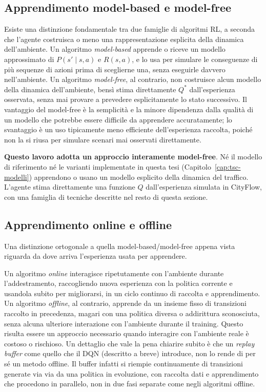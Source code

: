 \subsection{Apprendimento model-based e model-free}
\label{subsec:model-free}

Esiste una distinzione fondamentale tra due famiglie di algoritmi RL, a
seconda che l'agente costruisca o meno una rappresentazione esplicita
della dinamica dell'ambiente. Un algoritmo \emph{model-based} apprende
o riceve un modello approssimato di $P(s'\mid s,a)$ e $R(s,a)$, e lo usa
per simulare le conseguenze di più
sequenze di azioni prima di sceglierne una, senza eseguirle davvero nell'ambiente.
Un algoritmo \emph{model-free}, al contrario, non costruisce alcun modello della dinamica dell'ambiente, bensì stima
direttamente $Q^*$ dall'esperienza osservata, senza mai
provare a prevedere esplicitamente lo stato successivo. Il vantaggio del
model-free è la semplicità e la minore dipendenza dalla qualità di un
modello che potrebbe essere difficile da apprendere accuratamente; lo
svantaggio è un uso tipicamente meno efficiente dell'esperienza raccolta,
poiché non la si riusa per simulare scenari mai osservati direttamente.

\textbf{Questo lavoro adotta un approccio interamente model-free}. Né il
modello di riferimento \citep{wang2022metastgat} né le varianti
implementate in questa tesi (Capitolo~\ref{cap:tsc-modelli}) apprendono o
usano un modello esplicito della dinamica del traffico. L'agente stima
direttamente una funzione $Q$ dall'esperienza simulata in CityFlow, con una
famiglia di tecniche descritte nel resto di questa sezione.

\subsection{Apprendimento online e offline}
\label{subsec:online-offline}

Una distinzione ortogonale a quella model-based/model-free appena vista
riguarda da dove arriva l'esperienza usata per apprendere.

Un algoritmo \emph{online} interagisce ripetutamente con l'ambiente
durante l'addestramento, raccogliendo nuova esperienza con la politica
corrente e usandola subito per migliorarsi, in un ciclo continuo di raccolta e apprendimento.
Un algoritmo \emph{offline}, al contrario, apprende da un
insieme fisso di transizioni raccolto in precedenza, magari con una
politica diversa o addirittura sconosciuta, senza alcuna ulteriore
interazione con l'ambiente durante il training. Questo risulta essere un approccio necessario
quando interagire con l'ambiente reale è costoso o rischioso.
Un dettaglio che vale la pena chiarire subito è che un
\emph{replay buffer} come quello che il DQN (descritto a breve) introduce,
non lo rende di per sé un metodo offline. Il buffer infatti si riempie
continuamente di transizioni generate via via da una politica in
evoluzione, con raccolta dati e apprendimento che procedono in parallelo, non in
due fasi separate come negli algoritmi offline.

